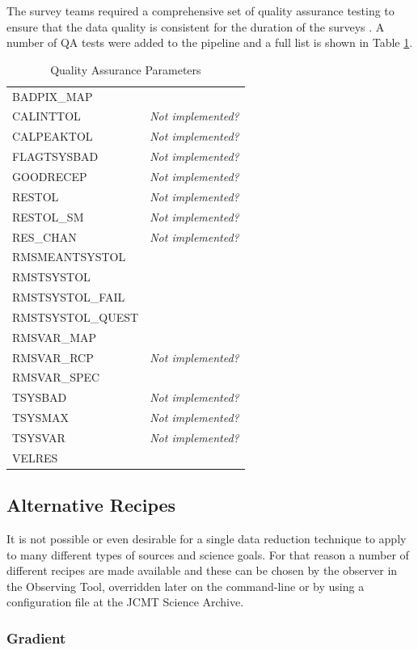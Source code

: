 \documentclass[final,authoryear,5p,times,twocolumn]{elsarticle}
\begin{document}
The survey teams required a comprehensive set of quality assurance
testing to ensure that the data quality is consistent for the duration
of the surveys \citep{2008JCMTLSQA}. A number of QA tests were added
to the pipeline and a full list is shown in Table \ref{tab:qa:params}.

\begin{table}
\caption{Quality Assurance Parameters}
\label{tab:qa:params}
\begin{tabular}{ll}
BADPIX\_MAP  & \\
CALINTTOL & \textit{Not implemented?} \\
CALPEAKTOL & \textit{Not implemented?} \\
FLAGTSYSBAD & \textit{Not implemented?} \\
GOODRECEP & \textit{Not implemented?} \\
RESTOL & \textit{Not implemented?} \\
RESTOL\_SM & \textit{Not implemented?}  \\
RES\_CHAN & \textit{Not implemented?}  \\
RMSMEANTSYSTOL & \\
RMSTSYSTOL & \\
RMSTSYSTOL\_FAIL & \\
RMSTSYSTOL\_QUEST & \\
RMSVAR\_MAP & \\
RMSVAR\_RCP &  \textit{Not implemented?} \\
RMSVAR\_SPEC & \\
TSYSBAD &  \textit{Not implemented?} \\
TSYSMAX &  \textit{Not implemented?} \\
TSYSVAR &  \textit{Not implemented?} \\
VELRES
\end{tabular}
\end{table}

\subsection{Alternative Recipes}

It is not possible or even desirable for a single data reduction
technique to apply to many different types of sources and science
goals. For that reason a number of different recipes are made
available and these can be chosen by the observer in the Observing
Tool, overridden later on the command-line or by using a
configuration file at the JCMT Science Archive.

\subsubsection{Gradient}
\end{document}
